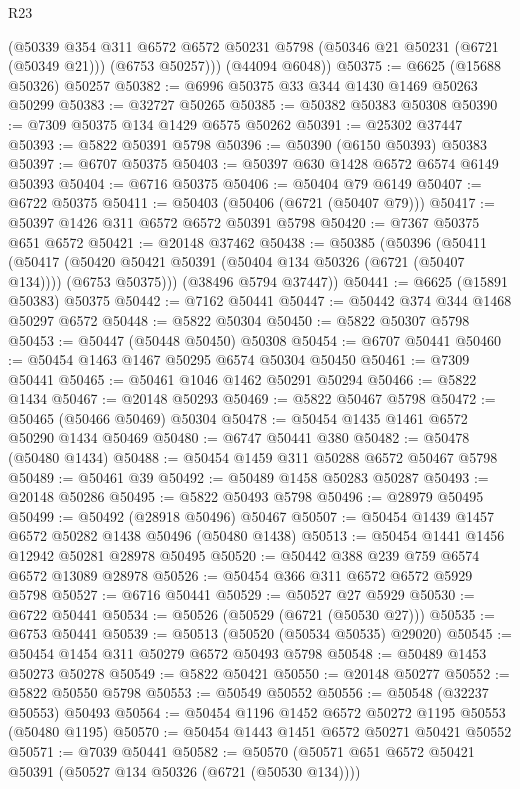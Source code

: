 \begin{lexlean}{R23}
\begin{coremodule}
        (@50339
          @354
          @311
          @6572
          @6572
          @50231
          @5798
          (@50346 @21 @50231 (@6721 (@50349 @21)))
          (@6753 @50257)))
      (@44094 @6048))
@50375 := @6625 (@15688 @50326) @50257
@50382 := @6996 @50375 @33 @344 @1430 @1469 @50263 @50299
@50383 := @32727 @50265
@50385 := @50382 @50383 @50308
@50390 := @7309 @50375 @134 @1429 @6575 @50262
@50391 := @25302 @37447
@50393 := @5822 @50391 @5798
@50396 := @50390 (@6150 @50393) @50383
@50397 := @6707 @50375
@50403 := @50397 @630 @1428 @6572 @6574 @6149 @50393
@50404 := @6716 @50375
@50406 := @50404 @79 @6149
@50407 := @6722 @50375
@50411 := @50403 (@50406 (@6721 (@50407 @79)))
@50417 := @50397 @1426 @311 @6572 @6572 @50391 @5798
@50420 := @7367 @50375 @651 @6572
@50421 := @20148 @37462
@50438 := @50385
    (@50396
      (@50411
        (@50417 (@50420 @50421 @50391 (@50404 @134 @50326 (@6721 (@50407 @134)))) (@6753 @50375)))
      (@38496 @5794 @37447))
@50441 := @6625 (@15891 @50383) @50375
@50442 := @7162 @50441
@50447 := @50442 @374 @344 @1468 @50297 @6572
@50448 := @5822 @50304
@50450 := @5822 @50307 @5798
@50453 := @50447 (@50448 @50450) @50308
@50454 := @6707 @50441
@50460 := @50454 @1463 @1467 @50295 @6574 @50304 @50450
@50461 := @7309 @50441
@50465 := @50461 @1046 @1462 @50291 @50294
@50466 := @5822 @1434
@50467 := @20148 @50293
@50469 := @5822 @50467 @5798
@50472 := @50465 (@50466 @50469) @50304
@50478 := @50454 @1435 @1461 @6572 @50290 @1434 @50469
@50480 := @6747 @50441 @380
@50482 := @50478 (@50480 @1434)
@50488 := @50454 @1459 @311 @50288 @6572 @50467 @5798
@50489 := @50461 @39
@50492 := @50489 @1458 @50283 @50287
@50493 := @20148 @50286
@50495 := @5822 @50493 @5798
@50496 := @28979 @50495
@50499 := @50492 (@28918 @50496) @50467
@50507 := @50454 @1439 @1457 @6572 @50282 @1438 @50496 (@50480 @1438)
@50513 := @50454 @1441 @1456 @12942 @50281 @28978 @50495
@50520 := @50442 @388 @239 @759 @6574 @6572 @13089 @28978
@50526 := @50454 @366 @311 @6572 @6572 @5929 @5798
@50527 := @6716 @50441
@50529 := @50527 @27 @5929
@50530 := @6722 @50441
@50534 := @50526 (@50529 (@6721 (@50530 @27)))
@50535 := @6753 @50441
@50539 := @50513 (@50520 (@50534 @50535) @29020)
@50545 := @50454 @1454 @311 @50279 @6572 @50493 @5798
@50548 := @50489 @1453 @50273 @50278
@50549 := @5822 @50421
@50550 := @20148 @50277
@50552 := @5822 @50550 @5798
@50553 := @50549 @50552
@50556 := @50548 (@32237 @50553) @50493
@50564 := @50454 @1196 @1452 @6572 @50272 @1195 @50553 (@50480 @1195)
@50570 := @50454 @1443 @1451 @6572 @50271 @50421 @50552
@50571 := @7039 @50441
@50582 := @50570 (@50571 @651 @6572 @50421 @50391 (@50527 @134 @50326 (@6721 (@50530 @134))))

\end{coremodule}
\end{lexlean}
